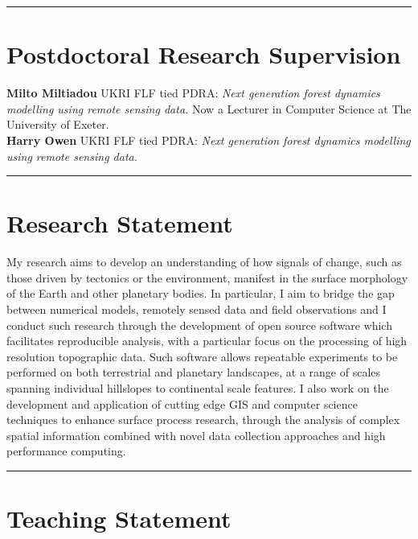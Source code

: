 \documentclass[10pt, a4paper]{article}
\newcommand{\years}[1]{\marginnote{\scriptsize #1}}
\begin{document}
\hrule
\section*{Postdoctoral Research Supervision}
\noindent

\years{2022-2024} \textbf{Milto Miltiadou} UKRI FLF tied PDRA: \textit{Next generation forest dynamics modelling using remote sensing data.} Now a Lecturer in Computer Science at The University of Exeter.\\[0.05cm]
\years{2021--} \textbf{Harry Owen} UKRI FLF tied PDRA: \textit{Next generation forest dynamics modelling using remote sensing data.}\\[0.05cm]


\iflong

  \hrule
  \section*{Research Statement}
  \noindent

  My research aims to develop an understanding of how signals of change, such as those driven by tectonics or the environment, manifest in the surface morphology of the Earth and other planetary bodies. In particular, I aim to bridge the gap between numerical models, remotely sensed data and field observations and I conduct such research through the development of open source software which facilitates reproducible analysis, with a particular focus on the processing of high resolution topographic data. Such software allows repeatable experiments to be performed on both terrestrial and planetary landscapes, at a range of scales spanning individual hillslopes to continental scale features. I also work on the development and application of cutting edge GIS and computer science techniques to enhance surface process research, through the analysis of complex spatial information combined with novel data collection approaches and high performance computing.\\[0.05cm]

  \hrule
  \section*{Teaching Statement}
  \noindent
\end{document}
